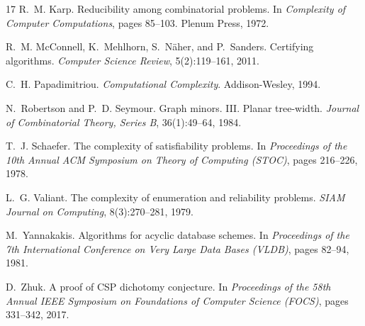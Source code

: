 \documentclass[11pt]{article}
\theoremstyle{plain}
\theoremstyle{definition}
\theoremstyle{remark}
\begin{document}
\begin{thebibliography}{17}
 R.~M. Karp. Reducibility among combinatorial problems.
In \emph{Complexity of Computer Computations}, pages 85--103. Plenum Press,
1972.

 R.~M. McConnell, K.~Mehlhorn, S.~N\"aher, and P.~Sanders.
Certifying algorithms. \emph{Computer Science Review}, 5(2):119--161, 2011.

 C.~H. Papadimitriou. \emph{Computational
Complexity}. Addison-Wesley, 1994.

 N.~Robertson and P.~D. Seymour.
Graph minors. III. Planar tree-width. \emph{Journal of Combinatorial Theory,
Series B}, 36(1):49--64, 1984.

 T.~J. Schaefer. The complexity of satisfiability
problems. In \emph{Proceedings of the 10th Annual ACM Symposium on Theory of
Computing (STOC)}, pages 216--226, 1978.

 L.~G. Valiant. The complexity of enumeration and
reliability problems. \emph{SIAM Journal on Computing}, 8(3):270--281, 1979.

 M.~Yannakakis. Algorithms for acyclic database
schemes. In \emph{Proceedings of the 7th International Conference on Very
Large Data Bases (VLDB)}, pages 82--94, 1981.

 D.~Zhuk. A proof of CSP dichotomy conjecture. In
\emph{Proceedings of the 58th Annual IEEE Symposium on Foundations of
Computer Science (FOCS)}, pages 331--342, 2017.

\end{thebibliography}
\end{document}
